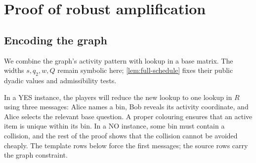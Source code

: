 \documentclass[11pt]{article} \usepackage[utf8]{inputenc}
\theoremstyle{plain} \newtheorem{theorem}{Theorem}[section]
\theoremstyle{definition} \newaliascnt{definition}{theorem}
\begin{document}
\section{Proof of robust amplification}
\label{sec:amplification-proof}

\subsection{Encoding the graph}

We combine the graph's activity pattern with lookup in a base matrix.
The widths \(s,q_2,w,Q\) remain symbolic here; \cref{lem:full-schedule}
fixes their public dyadic values and admissibility tests.

In a YES instance, the players will reduce the new lookup to one lookup in
$R$ using three messages: Alice names a bin, Bob reveals its activity
coordinate, and Alice selects the relevant base question. A proper colouring
ensures that an active item is unique within its bin. In a NO instance, some
bin must contain a collision, and the rest of the proof shows that the collision
cannot be avoided cheaply. The template rows below force the first messages;
the source rows carry the graph constraint.
\end{document}
